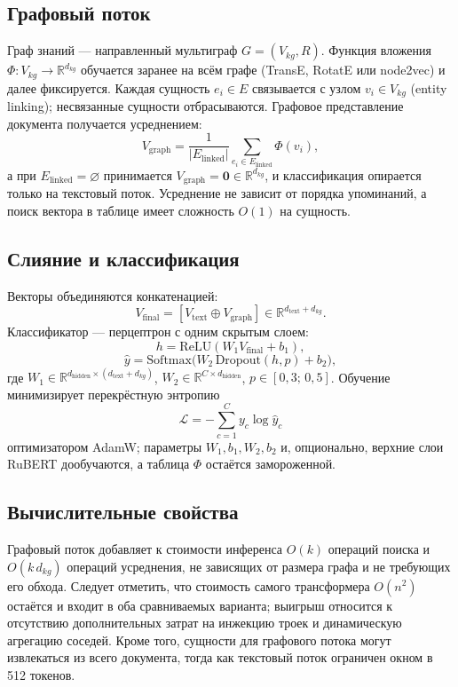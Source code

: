 \documentclass{misisarticle}
\begin{document}
\subsection{Графовый поток}
Граф знаний --- направленный мультиграф $G=(V_{kg},R)$. Функция вложения $\Phi: V_{kg}\to\mathbb{R}^{d_{kg}}$ обучается заранее на всём графе (TransE, RotatE или node2vec) и далее фиксируется. Каждая сущность $e_i\in E$ связывается с узлом $v_i\in V_{kg}$ (entity linking); несвязанные сущности отбрасываются. Графовое представление документа получается усреднением:
\begin{equation}
V_{\mathrm{graph}}=\frac{1}{|E_{\mathrm{linked}}|}\sum_{e_i\in E_{\mathrm{linked}}}\Phi(v_i),
\end{equation}
а при $E_{\mathrm{linked}}=\varnothing$ принимается $V_{\mathrm{graph}}=\mathbf{0}\in\mathbb{R}^{d_{kg}}$, и классификация опирается только на текстовый поток. Усреднение не зависит от порядка упоминаний, а поиск вектора в таблице имеет сложность $O(1)$ на сущность.

\subsection{Слияние и классификация}
Векторы объединяются конкатенацией:
\begin{equation}
V_{\mathrm{final}}=[V_{\mathrm{text}}\oplus V_{\mathrm{graph}}]\in\mathbb{R}^{d_{\mathrm{text}}+d_{kg}}.
\end{equation}
Классификатор --- перцептрон с одним скрытым слоем:
\begin{equation}
h=\mathrm{ReLU}(W_1V_{\mathrm{final}}+b_1),
\end{equation}
\begin{equation}
\hat{y}=\mathrm{Softmax}\bigl(W_2\,\mathrm{Dropout}(h,p)+b_2\bigr),
\end{equation}
где $W_1\in\mathbb{R}^{d_{\mathrm{hidden}}\times(d_{\mathrm{text}}+d_{kg})}$, $W_2\in\mathbb{R}^{C\times d_{\mathrm{hidden}}}$, $p\in[0{,}3;\,0{,}5]$. Обучение минимизирует перекрёстную энтропию
\begin{equation}
\mathcal{L}=-\sum_{c=1}^{C}y_c\log\hat{y}_c
\end{equation}
оптимизатором AdamW; параметры $W_1,b_1,W_2,b_2$ и, опционально, верхние слои RuBERT дообучаются, а таблица $\Phi$ остаётся замороженной.

\subsection{Вычислительные свойства}
Графовый поток добавляет к стоимости инференса $O(k)$ операций поиска и $O(k\,d_{kg})$ операций усреднения, не зависящих от размера графа и не требующих его обхода. Следует отметить, что стоимость самого трансформера $O(n^2)$ остаётся и входит в оба сравниваемых варианта; выигрыш относится к отсутствию дополнительных затрат на инжекцию троек и динамическую агрегацию соседей. Кроме того, сущности для графового потока могут извлекаться из всего документа, тогда как текстовый поток ограничен окном в 512 токенов.
\end{document}

